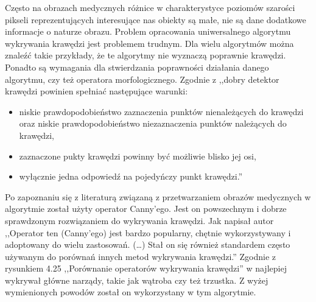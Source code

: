 \documentclass[a4paper,11pt,twoside]{report}
\theoremstyle{definition}
\begin{document}
Często na obrazach medycznych różnice w charakterystyce poziomów szarości pikseli reprezentujących interesujące nas obiekty są małe, nie są dane dodatkowe informacje o naturze obrazu. Problem opracowania uniwersalnego algorytmu wykrywania krawędzi jest problemem trudnym. Dla wielu algorytmów można znaleźć takie przykłady, że te algorytmy nie wyznaczą poprawnie krawędzi. Ponadto są wymagania dla stwierdzania poprawności działania danego algorytmu, czy też operatora morfologicznego. Zgodnie z \cite{Cyfrowe przetwarzanie obrazów medycznych} ,,dobry detektor krawędzi powinien spełniać następujące warunki:
\begin{itemize}[noitemsep]
\item {niskie prawdopodobieństwo zaznaczenia punktów nienależących do krawędzi oraz niskie prawdopodobieństwo niezaznaczenia punktów należących do krawędzi,}
\item {zaznaczone pukty krawędzi powinny być możliwie blisko jej osi,}
\item {wyłącznie jedna odpowiedź na pojedyńczy punkt krawędzi.''}
\end{itemize}

Po zapoznaniu się z literaturą związaną z przetwarzaniem obrazów medycznych w algorytmie został użyty operator Canny'ego. Jest on powszechnym i dobrze sprawdzonym rozwiązaniem do wykrywania krawędzi. Jak napisał autor \cite{Cyfrowe przetwarzanie obrazów medycznych} ,,Operator ten (Canny'ego) jest bardzo popularny, chętnie wykorzystywany i adoptowany do wielu zastosowań. (\dots) Stał on się również standardem często używanym do porównań innych metod wykrywania krawędzi.'' Zgodnie z rysunkiem 4.25 ,,Porównanie operatorów wykrywania krawędzi'' w \cite{Cyfrowe przetwarzanie obrazów medycznych} najlepiej wykrywał główne narządy, takie jak wątroba czy też trzustka. Z wyżej wymienionych powodów został on wykorzystany w tym algorytmie.
\end{document}
